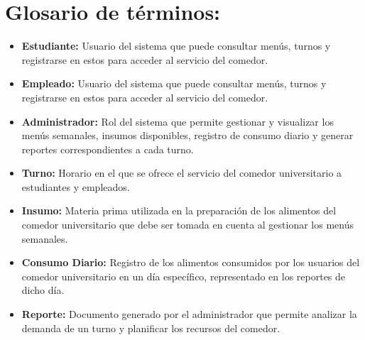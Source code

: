 \documentclass{article}
\begin{document}
    \section*{Glosario de términos:}
    \medskip
    \begin{itemize}
        \item \textbf{Estudiante:} Usuario del sistema que puede consultar menús, turnos y registrarse en estos para acceder al servicio del comedor.
        \item \textbf{Empleado:} Usuario del sistema que puede consultar menús, turnos y registrarse en estos para acceder al servicio del comedor.
        \item \textbf{Administrador:} Rol del sistema que permite gestionar y visualizar los menús semanales, insumos disponibles, registro de consumo diario y generar reportes correspondientes a cada turno.
        \item \textbf{Turno:} Horario en el que se ofrece el servicio del comedor universitario a estudiantes y empleados.
        \item \textbf{Insumo:} Materia prima utilizada en la preparación de los alimentos del comedor universitario que debe ser tomada en cuenta al gestionar los menús semanales.
        \item \textbf{Consumo Diario:} Registro de los alimentos consumidos por los usuarios del comedor universitario en un día específico, representado en los reportes de dicho día.
        \item \textbf{Reporte:} Documento generado por el administrador que permite analizar la demanda de un turno y planificar los recursos del comedor.
    \end{itemize}
\end{document}

